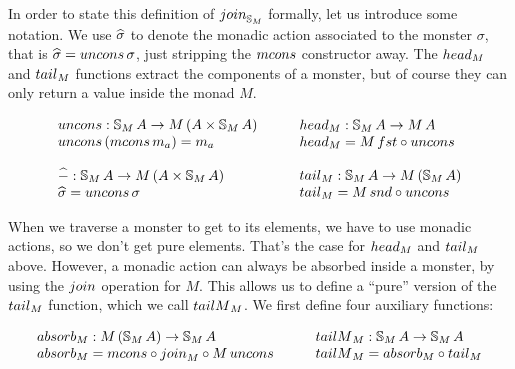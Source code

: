 In order to state this definition of $\join_{\stream{M}}$ formally, let us introduce some notation.
We use $\widehat{\sigma}$ to denote the monadic action associated to the monster $\sigma$, that is $ \unc{\sigma} = \uncons\,\sigma $, just stripping the $\mcons$ constructor away.
The $\head_M$ and $\tail_M$ functions extract the components of a monster, but of course they can only return a value inside the monad $M$.

$$
\begin{array}{l}
\uncons : \stream{M}\,A \rightarrow M\,(A \times \stream{M}\,A)\\
\uncons\, (\mcons\, m_a) = m_a \\
\,\\
\unc{-} : \stream{M}\,A \rightarrow M\,(A\times \stream{M}\,A)\\
\unc{\sigma} = \uncons\,\sigma
\end{array}
\qquad
\begin{array}{l}
\head_M : \stream{M}\,A \rightarrow M\,A\\
\head_M = M\,\fst \comp \uncons\\
\,\\
\tail_M : \stream{M}\,A \rightarrow M\,(\stream{M}\,A)\\
\tail_M = M\,\snd \comp \uncons\\
\end{array}
$$

When we traverse a monster to get to its elements, we have to use monadic actions, so we don't get pure elements.
That's the case for $\head_M$ and $\tail_M$ above.
However, a monadic action can always be absorbed inside a monster, by using the $\join$ operation for $M$.
This allows us to define a ``pure'' version of the $\tail_M$ function, which we call $\tailm_M$.
We first define four auxiliary functions:

$$
\begin{array}{l}
\absorb_M : M\,(\stream{M}\,A) \rightarrow \stream{M}\,A \\
\absorb_M =  \mcons \comp \join_{M} \comp M\,\uncons
\end{array}
  \qquad
\begin{array}{l}
\tailm_M : \stream{M}\,A \rightarrow \stream{M}\,A \\
\tailm_M = \absorb_M \comp \tail_M
\end{array}
$$

